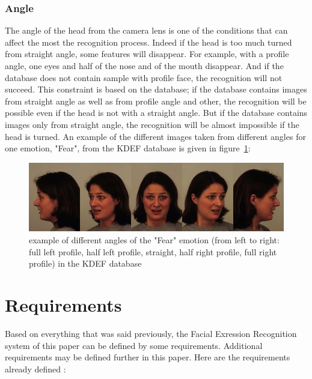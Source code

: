 \subsubsection{Angle}

\vspace{\baselineskip}
\noindent The angle of the head from the camera lens is one of the conditions that can affect the most the recognition process. Indeed if the head is too much turned from straight angle, some features will disappear. For example, with a profile angle, one eyes and half of the nose and of the mouth disappear. And if the database does not contain sample with profile face, the recognition will not succeed. This constraint is based on the database; if the database contains images from straight angle as well as from profile angle and other, the recognition will be possible even if the head is not with a straight angle. But if the database contains images only from straight angle, the recognition will be almost impossible if the head is turned. An example of the different images taken from different angles for one emotion, "Fear", from the KDEF database is given in figure~\ref{kdef_example_angle}:
\newline

\begin{figure}[!h]
\begin{center}
\noindent \includegraphics[scale=0.8]{figures/kdef_example_angle} 
\newline
\caption{example of different angles of the "Fear" emotion (from left to right: full left profile, half left profile, straight, half right profile, full right profile) in the KDEF database}
\label{kdef_example_angle}
\end{center} 
\end{figure}

\section{Requirements}

\vspace{\baselineskip}
\noindent Based on everything that was said previously, the Facial Exression Recognition system of this paper can be defined by some requirements. Additional requirements may be defined further in this paper. Here are the requirements already defined :
\newline

